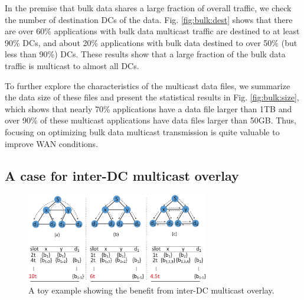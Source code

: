 In the premise that bulk data shares a large fraction of overall traffic, we check the number of destination DCs of the data. Fig. \ref{fig:bulk:dest} shows that there are over 60\% applications with bulk data multicast traffic are destined to at least 90\% DCs, and about 20\% applications with bulk data destined to over 50\% (but less than 90\%) DCs. These results show that a large fraction of the bulk data traffic is multicast to almost all DCs.

To further explore the characteristics of the multicast data files, we summarize the data size of these files and present the statistical results in Fig. \ref{fig:bulk:size}, which shows that nearly 70\% applications have a data file larger than 1TB and over 90\% of these multicast applications have data files larger than 50GB. Thus, focusing on optimizing bulk data multicast transmission is quite valuable to improve WAN conditions.

%
%
%
%

\subsection{A case for inter-DC multicast overlay}
\label{subsec:motivation:case-for}

\begin{figure}[t]
\centering
\includegraphics[width=80mm]{images/example.eps}
\caption{A toy example showing the benefit from inter-DC multicast overlay.}
\label{fig:case:example}
\vspace{-0.4cm}
\end{figure}

